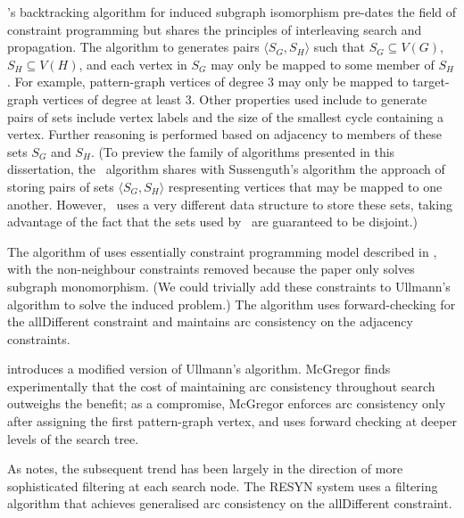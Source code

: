 \citet{sussenguth1965graph}'s backtracking algorithm for induced subgraph
isomorphism pre-dates the field of constraint programming but shares the
principles of interleaving search and propagation.  The algorithm to generates
pairs $\langle S_G, S_H \rangle$ such that $S_G \subseteq V(G)$, $S_H \subseteq
V(H)$, and each vertex in $S_G$ may only be mapped to some member of $S_H$.
For example, pattern-graph vertices of degree 3 may only be mapped to
target-graph vertices of degree at least 3.  Other properties used include to
generate pairs of sets include vertex labels and the size of the smallest cycle
containing a vertex.  Further reasoning is performed based on adjacency to
members of these sets $S_G$ and $S_H$.  (To preview the family of algorithms
presented in this dissertation, the \McSplit\ algorithm shares with
Sussenguth's algorithm the approach of storing pairs of sets $\langle S_G, S_H
\rangle$ respresenting vertices that may be mapped to one another. However,
\McSplit\ uses a very different data structure to store these sets, taking
advantage of the fact that the sets used by \McSplit\ are guaranteed to be
disjoint.)

The algorithm of \citet{ullmann1976algorithm} uses essentially constraint
programming model described in , with the non-neighbour
constraints removed because the paper only solves subgraph monomorphism.
(We could trivially add these constraints to Ullmann's algorithm to solve 
the induced problem.)
The algorithm uses forward-checking for the allDifferent constraint and
maintains arc consistency on the adjacency constraints.

\citet{DBLP:journals/isci/McGregor79} introduces a modified version of
Ullmann's algorithm.  McGregor finds experimentally that the cost of
maintaining arc consistency throughout search outweighs the benefit; as a
compromise, McGregor enforces arc consistency only after assigning the first
pattern-graph vertex, and uses forward checking at deeper levels of the search
tree.

As \citet{mccreesh2017solving} notes, the subsequent trend has been largely
in the direction of more sophisticated filtering at each search node.
The RESYN system \citep{vism92,regin1995developpement} uses a filtering algorithm
that achieves generalised arc consistency on the allDifferent constraint.


